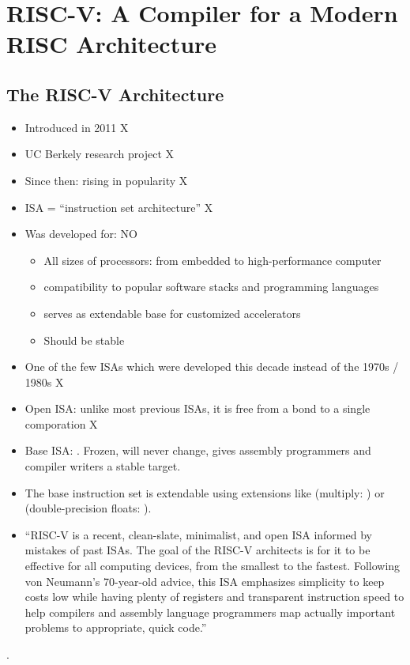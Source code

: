 \section{RISC-V: A Compiler for a Modern RISC Architecture}
\subsection{The RISC-V Architecture}

\begin{itemize}
	\item Introduced in 2011 X
	\item UC Berkely research project X
	\item Since then: rising in popularity X
	\item ISA = \enquote{instruction set architecture} X
	\item Was developed for: NO
	      \begin{itemize}
		      \item All sizes of processors: from embedded to high-performance computer
		      \item compatibility to popular software stacks and programming languages
		      \item serves as extendable base for customized accelerators
		      \item Should be stable
	      \end{itemize}
	\item One of the few ISAs which were developed this decade instead of the 1970s / 1980s X
	\item Open ISA: unlike most previous ISAs, it is free from a bond to a single comporation X
    \item Base ISA: .
        Frozen, will never change, gives assembly programmers and compiler writers a stable target.
    \item The base instruction set is extendable using extensions like (multiply: ) or (double-precision floats: ).
    \item \enquote{RISC-V is a recent, clean-slate, minimalist, and open ISA informed by mistakes of past ISAs. The goal of the RISC-V architects is for it to be effective for all computing devices, from the smallest to the fastest. Following von Neumann’s 70-year-old advice, this ISA emphasizes simplicity to keep costs low while having plenty of registers and transparent instruction speed to help compilers and assembly language programmers map actually important problems to appropriate, quick code.}\cite[p.~11]{Patterson2017}
\end{itemize} \cite[Chapter~1]{Patterson2017}.

